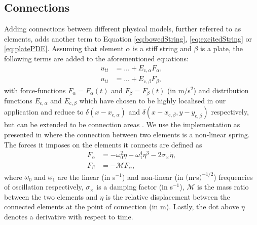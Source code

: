 \subsection{Connections}\label{sec:connections}
Adding connections between different physical models, further referred to as elements, adds another term to Equation \eqref{eq:bowedString}, \eqref{eq:excitedString} or \eqref{eq:platePDE}. Assuming that element $\alpha$ is a stiff string and $\beta$ is a plate, the following terms are added to the aforementioned equations:
\begin{subequations}
\begin{align}
    \label{eq:stringConnection}
    u_{tt} &= ... + E_{\text{c},\alpha}F_\alpha, \\
    \label{eq:plateConnection}
    u_{tt} &= ... + E_{\text{c},\beta}F_\beta,
\end{align}
\end{subequations}
with force-functions $F_\alpha = F_\alpha(t)$ and $F_\beta = F_\beta(t)$ (in m/s$^2$) and distribution functions $E_{\text{c},\alpha}$ and $E_{\text{c},\beta}$ which have chosen to be highly localised in our application and reduce to $\delta(x-x_{\text{c},\alpha})$ and $\delta(x-x_{\text{c},\beta}, y-y_{\text{c},\beta})$ respectively, but can be extended to be connection areas \cite{Bilbao2009:ModularPercussion}. We use the implementation as presented in \cite{Bilbao2009:ModularPercussion} where the connection between two elements is a non-linear spring. The forces it imposes on the elements it connects are defined as
\begin{subequations}\label{eq:connectionsPDE}
\begin{align}
    F_\alpha &= -\omega_0^2\eta - \omega_1^4\eta^3 - 2\sigma_\times\dot\eta,\\
    \label{eq:FBeta} F_\beta &= -\mathcal{M}F_\alpha,
\end{align}
\end{subequations}
where $\omega_0$ and $\omega_1$ are the linear (in s$^{-1}$) and non-linear (in $($m$\cdot$s$)^{-1/2}$) frequencies of oscillation respectively, $\sigma_\times$ is a damping factor (in s$^{-1}$), $\mathcal{M}$ is the mass ratio between the two elements and $\eta$ is the relative displacement between the connected elements at the point of connection (in m). Lastly, the dot above $\eta$ denotes a derivative with respect to time.

